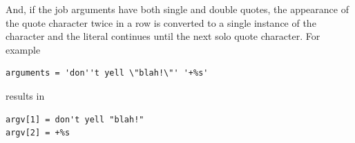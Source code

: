 And, if the job arguments have both single and double quotes,
the appearance of the quote character twice in a
row is converted to a single instance of the character and the literal
continues until the next solo quote character.
For example
\begin{verbatim}
arguments = 'don''t yell \"blah!\"' '+%s'
\end{verbatim}
results in
\begin{verbatim}
argv[1] = don't yell "blah!"
argv[2] = +%s
\end{verbatim}





